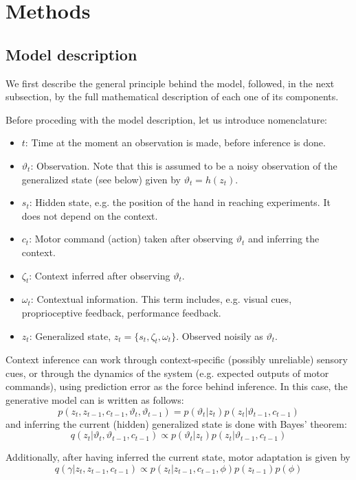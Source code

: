 \documentclass[a4paper,doc,floatsintext,natbib]{apa6}
\begin{document}
\section{Methods}
\subsection{Model description}
\label{subsection:model-description}
We first describe the general principle behind the model, followed, in the next
subsection, by the full mathematical description of each one of its components.

Before proceding with the model description, let us introduce nomenclature:
\begin{itemize}
\item $t$: Time at the moment an observation is made, before inference is done.
\item $\vartheta_t$: Observation. Note that this is assumed to be a noisy
observation of the generalized state (see below) given by $\vartheta_t = h(z_t)$.
\item $s_t$: Hidden state, e.g. the position of the hand in reaching
experiments. It does not depend on the context.
\item $c_t$: Motor command (action) taken after observing $\vartheta_t$ and inferring the context.
\item $\zeta_t$: Context inferred after observing $\vartheta_t$.
\item $\omega_t$: Contextual information. This term includes, e.g. visual cues,
proprioceptive feedback, performance feedback.
\item $z_t$: Generalized state, $z_t = \{s_t, \zeta_t, \omega_t\}$. Observed noisily
as $\vartheta_t$.
\end{itemize}

Context inference can work through context-specific (possibly unreliable) sensory cues,
or through the dynamics of the system (e.g. expected outputs of motor
commands), using prediction error as the force behind inference. In this case,
the generative model can is written as follows:
\[
p(z_t, z_{t-1}, c_{t-1}, \vartheta_t, \vartheta_{t-1}) = p(\vartheta_t | z_t)p(z_t|\vartheta_{t-1}, c_{t-1})
\]
and inferring the current (hidden) generalized state is done with Bayes' theorem:
\[
  q(z_t | \vartheta_t, \vartheta_{t-1}, c_{t-1}) \propto p(\vartheta_t | z_t)p(z_t|\vartheta_{t-1}, c_{t-1})
\]
  
Additionally, after having inferred the current state, motor adaptation is given by
\[
q(\gamma | z_t, z_{t-1}, c_{t-1}) \propto p(z_t | z_{t-1}, c_{t-1}, \phi)p(z_{t-1})p(\phi)
\]
\end{document}
